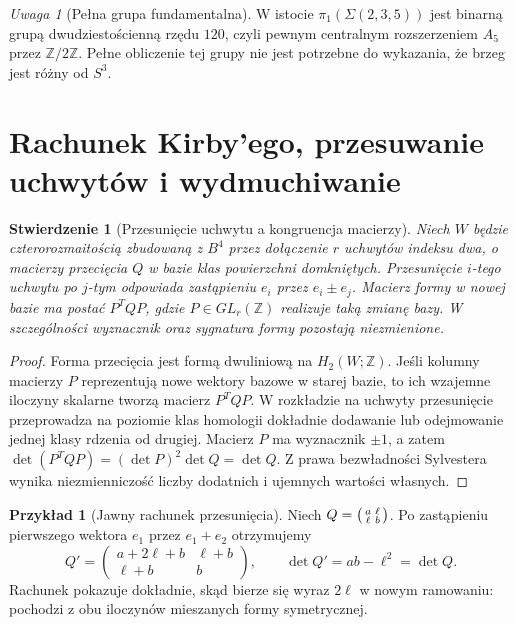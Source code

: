 \documentclass[11pt,a4paper]{report}
\numberwithin{equation}{section}
\theoremstyle{plain}
\newtheorem{stwierdzenie}[twierdzenie]{Stwierdzenie}
\theoremstyle{definition}
\newtheorem{przyklad}[twierdzenie]{Przykład}
\theoremstyle{remark}
\newtheorem{uwaga}[twierdzenie]{Uwaga}
\begin{document}
\begin{uwaga}[Pełna grupa fundamentalna]
W istocie $\pi_1(\Sigma(2,3,5))$ jest binarną grupą
dwudziestościenną rzędu $120$, czyli pewnym centralnym
rozszerzeniem $A_5$ przez $\mathbb Z/2\mathbb Z$.
Pełne obliczenie tej grupy nie jest potrzebne do
wykazania, że brzeg jest różny od $S^3$.
\end{uwaga}

\section{Rachunek Kirby'ego, przesuwanie uchwytów i wydmuchiwanie}
\label{sec:tg-plumbing-kirby}

\begin{stwierdzenie}[Przesunięcie uchwytu a kongruencja macierzy]
Niech $W$ będzie czterorozmaitością zbudowaną z $B^4$
przez dołączenie $r$ uchwytów indeksu dwa, o macierzy
przecięcia $Q$ w bazie klas powierzchni domkniętych.
Przesunięcie $i$-tego uchwytu po $j$-tym odpowiada
zastąpieniu $e_i$ przez $e_i\pm e_j$. Macierz formy
w nowej bazie ma postać $P^TQP$, gdzie
$P\in GL_r(\mathbb Z)$ realizuje taką zmianę bazy.
W szczególności wyznacznik oraz sygnatura formy
pozostają niezmienione.
\end{stwierdzenie}
\begin{proof}
Forma przecięcia jest formą dwuliniową na
$H_2(W;\mathbb Z)$. Jeśli kolumny macierzy $P$
reprezentują nowe wektory bazowe w starej bazie,
to ich wzajemne iloczyny skalarne tworzą macierz
$P^TQP$. W rozkładzie na uchwyty przesunięcie
przeprowadza na poziomie klas homologii dokładnie dodawanie lub
odejmowanie jednej klasy rdzenia od drugiej.
Macierz $P$ ma wyznacznik $\pm1$, a zatem
$\det(P^TQP)=(\det P)^2\det Q=\det Q$.
Z prawa bezwładności Sylvestera wynika niezmienniczość
liczby dodatnich i ujemnych wartości własnych.
\end{proof}

\begin{przyklad}[Jawny rachunek przesunięcia]
Niech $Q=\begin{psmallmatrix}a&\ell\\\ell&b\end{psmallmatrix}$.
Po zastąpieniu pierwszego wektora $e_1$ przez
$e_1+e_2$ otrzymujemy
\[
Q'=\begin{pmatrix}a+2\ell+b&\ell+b\\\ell+b&b\end{pmatrix},
\qquad \det Q'=ab-\ell^2=\det Q.
\]
Rachunek pokazuje dokładnie, skąd bierze się wyraz
$2\ell$ w nowym ramowaniu: pochodzi z obu iloczynów
mieszanych formy symetrycznej.
\end{przyklad}
\end{document}
